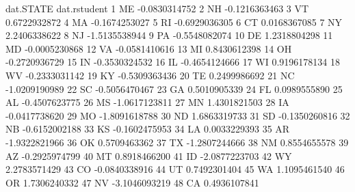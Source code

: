 \begin{Schunk}
\begin{Soutput}
   dat.STATE  dat.rstudent
1         ME -0.0830314752
2         NH -0.1216363463
3         VT  0.6722932872
4         MA -0.1674253027
5         RI -0.6929036305
6         CT  0.0168367085
7         NY  2.2406338622
8         NJ -1.5135538944
9         PA -0.5548082074
10        DE  1.2318804298
11        MD -0.0005230868
12        VA -0.0581410616
13        MI  0.8430612398
14        OH -0.2720936729
15        IN -0.3530324532
16        IL -0.4654124666
17        WI  0.9196178134
18        WV -0.2333031142
19        KY -0.5309363436
20        TE  0.2499986692
21        NC -1.0209190989
22        SC -0.5056470467
23        GA  0.5010905339
24        FL  0.0989555890
25        AL -0.4507623775
26        MS -1.0617123811
27        MN  1.4301821503
28        IA -0.0417738620
29        MO -1.8091618788
30        ND  1.6863319733
31        SD -0.1350260816
32        NB -0.6152002188
33        KS -0.1602475953
34        LA  0.0033229393
35        AR -1.9322821966
36        OK  0.5709463362
37        TX -1.2807244666
38        NM  0.8554655578
39        AZ -0.2925974799
40        MT  0.8918466200
41        ID -2.0877223703
42        WY  2.2783571429
43        CO -0.0840338916
44        UT  0.7492301404
45        WA  1.1095461540
46        OR  1.7306240332
47        NV -3.1046093219
48        CA  0.4936107841
\end{Soutput}
\end{Schunk}
